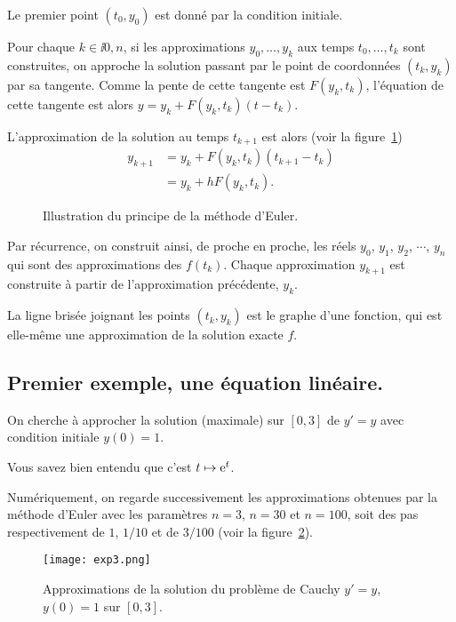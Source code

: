 Le premier point $(t_0,y_0)$ est donné par la condition initiale. 

Pour chaque $k \in \ii{0,n}$, si les approximations $y_0,\dots,y_k$ aux temps $t_0,\dots,t_k$ sont construites, on approche la solution passant par le point de coordonnées $(t_k,y_k)$ par sa tangente. 
Comme la pente de cette tangente est $F(y_k,t_k)$, l'équation de cette tangente est alors  $
  y = y_k + F(y_k,t_k) (t-t_k)$. 


L'approximation de la solution au temps $t_{k+1}$ est alors (voir la figure~\ref{11:fig:principeEuler})
\begin{align*}
  y_{k+1} &= y_k + F(y_k,t_k) (t_{k+1}-t_k) \\
          &= y_k + hF(y_k,t_k).
\end{align*}



\begin{figure}[h!]
\begin{center}
\resizebox{0.6\textwidth}{!}{}
\caption{Illustration du principe de la méthode d'Euler.}
\label{11:fig:principeEuler}
\end{center}
\end{figure}

Par récurrence, on construit ainsi, de proche en proche, les réels $y_0$, $y_1$, $y_2$, $\cdots$, $y_n$ qui 
sont des approximations des $f(t_k)$. Chaque approximation $y_{k+1}$ est construite à partir de 
l'approximation précédente, $y_k$.

La ligne brisée joignant les points $(t_k,y_k)$ est le graphe d'une fonction, qui est elle-même une 
approximation de la solution exacte $f$.

\subsection{Premier exemple, une équation linéaire.}
On cherche à approcher la solution (maximale) sur $[0,3]$ de $   y' = y$ avec condition initiale $y(0)=1$.

\begin{rem}
  Vous savez bien entendu que c'est  $t\mapsto \mathrm{e}^{t}$.
\end{rem}

Numériquement, on regarde successivement les approximations obtenues par la méthode d'Euler avec les paramètres $n=3$, $n=30$ et $n=100$, soit des pas respectivement de $1$, $1/10$ et de $3/100$ (voir la figure~\ref{11:fig:exp3}).
\begin{figure}[h!]
\begin{center}
\texttt{[image: exp3.png]}
\caption{Approximations de la solution du problème de Cauchy $y'=y$, $y(0)=1$ sur $[0,3]$.}
\label{11:fig:exp3}
\end{center}
\end{figure}

